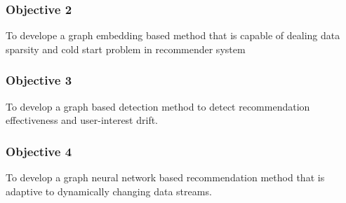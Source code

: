 

\subsubsection*{Objective 2}
To develope a graph embedding based method that is capable of dealing data sparsity and cold start problem in recommender system





\subsubsection*{Objective 3}
To develop a graph based detection method to detect recommendation effectiveness and user-interest drift.




\subsubsection*{Objective 4}
To develop a graph neural network based recommendation method that is adaptive to dynamically changing data streams.


